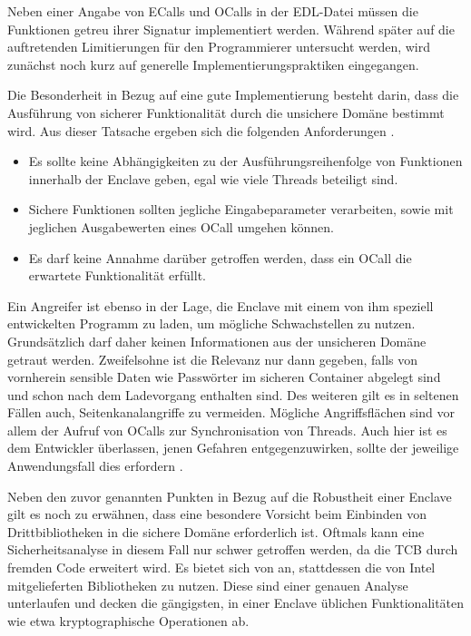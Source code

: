 Neben einer Angabe von \acp{ECall} und \acp{OCall} in der \ac{EDL}-Datei müssen die Funktionen getreu ihrer Signatur implementiert werden. Während später auf die auftretenden Limitierungen für den Programmierer untersucht werden, wird zunächst noch kurz auf generelle Implementierungspraktiken eingegangen. 

Die Besonderheit in Bezug auf eine gute Implementierung besteht darin, dass die Ausführung von sicherer Funktionalität durch die unsichere Domäne bestimmt wird. Aus dieser Tatsache ergeben sich die folgenden Anforderungen \cite{WinGuide}.

\begin{itemize}
	\item Es sollte keine Abhängigkeiten zu der Ausführungsreihenfolge von Funktionen innerhalb der Enclave geben, egal wie viele Threads beteiligt sind.
	\item Sichere Funktionen sollten jegliche Eingabeparameter verarbeiten, sowie mit jeglichen Ausgabewerten eines \ac{OCall} umgehen können.
	\item Es darf keine Annahme darüber getroffen werden, dass ein \ac{OCall} die erwartete Funktionalität erfüllt.
\end{itemize}

Ein Angreifer ist ebenso in der Lage, die Enclave mit einem von ihm speziell entwickelten Programm zu laden, um mögliche Schwachstellen zu nutzen. Grundsätzlich darf daher keinen Informationen aus der unsicheren Domäne getraut werden. Zweifelsohne ist die Relevanz nur dann gegeben, falls von vornherein sensible Daten wie Passwörter im sicheren Container abgelegt sind und schon nach dem Ladevorgang enthalten sind. Des weiteren gilt es in seltenen Fällen auch, Seitenkanalangriffe zu vermeiden. Mögliche Angriffsflächen sind vor allem der Aufruf von \acp{OCall} zur Synchronisation von Threads. Auch hier ist es dem Entwickler überlassen, jenen Gefahren entgegenzuwirken, sollte der jeweilige Anwendungsfall dies erfordern \cite{M.2016}.

Neben den zuvor genannten Punkten in Bezug auf die Robustheit einer Enclave gilt es noch zu erwähnen, dass eine besondere Vorsicht beim Einbinden von Drittbibliotheken in die sichere Domäne erforderlich ist. Oftmals kann eine Sicherheitsanalyse in diesem Fall nur schwer getroffen werden, da die \ac{TCB} durch fremden Code erweitert wird. Es bietet sich von an, stattdessen die von Intel mitgelieferten Bibliotheken zu nutzen. Diese sind einer genauen Analyse unterlaufen und decken die gängigsten, in einer Enclave üblichen Funktionalitäten wie etwa kryptographische Operationen ab.

